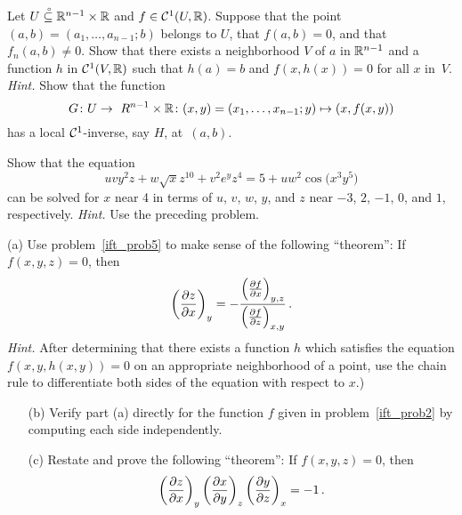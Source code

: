 \begin{prob}\label{ift_prob5} Let $U\overset{\thickspace{}_\circ}{\subseteq}\mathbb{R}^{n-1} \times \mathbb{R}$ and $f \in \mathcal{C}^1(U,\mathbb{R})$.
Suppose that the point $(a,b) = (a_1, \dots ,a_{n-1};b)$ belongs to $U$, that  $f(a,b) = 0$,
and that $f_n(a,b) \ne 0$.  Show that there exists a neighborhood $V$ of $a$ in $\mathbb{R}^{n-1}$ and
a function $h$ in  $\mathcal{C}^1(V,\mathbb{R})$ such that $h(a) = b$ and $f(x,h(x)) = 0$ for all $x$
in~$V$. \emph{Hint.} Show that the function
 \[G \colon U \rightarrow \ R^{n-1} \times \mathbb{R} \colon (x,y)
                    = (x_1, \dots ,x_{n-1};y) \mapsto (x,f(x,y)) \]
has a local $\mathcal{C}^1$-inverse, say $H$, at~$(a,b)$.
\end{prob}

\begin{prob} Show that the equation
  \[ uvy^2z + w\sqrt xz^{10} + v^2e^yz^4 = 5 + uw^2\cos\bigl(x^3y^5\bigr) \]
can be solved for $x$ near 4 in terms of  $u$, $v$, $w$, $y$, and $z$ near $-3$, $2$, $-1$,
$0$, and  $1$, respectively. \emph{Hint.} Use the preceding problem.
\end{prob}

\begin{prob}(a) Use problem~\ref{ift_prob5} to make sense of the following ``theorem'':
If $f(x,y,z) = 0$, then
  \[ \left(\frac{\partial z}{\partial x}\right)_{y} = -\frac{\left(\frac{\partial f}{\partial x}\right)_{y,z}}{\left(\frac{\partial f}{\partial z}\right)_{x,y}}\,. \]
\emph{Hint.} After determining that there exists a function $h$ which satisfies the equation
$f(x,y,h(x,y)) = 0$ on an appropriate neighborhood of a point, use the chain rule to
differentiate both sides of the equation with respect to $x$.)
 \begin{enumerate}
   \item[(b)] Verify part (a) directly for the function $f$ given in problem~\ref{ift_prob2}
by computing each side independently.
   \item[(c)] Restate and prove the following ``theorem'': If $f(x,y,z) = 0$, then
     \[ \left(\frac{\partial z}{\partial x}\right)_{y} \left(\frac{\partial x}{\partial y}\right)_{z} \left(\frac{\partial y}{\partial z}\right)_{x} = -1\,. \]
 \end{enumerate}
\end{prob}


